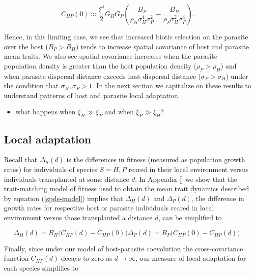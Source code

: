 \documentclass{article}
\begin{document}
\begin{equation}
  C_{HP}(0)\approx \frac{\xi^4}{2}G_HG_P\left(\frac{B_P}{\rho_H\sigma_H^4\sigma_P^2}-\frac{B_H}{\rho_P\sigma_H^2\sigma_P^4}\right).
\end{equation}

Hence, in this limiting case, we see that increased biotic selection on
the parasite over the host (\(B_P>B_H\)) tends to increase spatial
covariance of host and parasite mean traits. We also see spatial
covariance increases when the parasite population density is greater
than the host population density (\(\rho_P>\rho_H\)) and when parasite
dispersal distance exceeds host dispersal distance
(\(\sigma_P>\sigma_H\)) under the condition that
\(\sigma_H,\sigma_P>1\). In the next section we capitalize on these
results to understand patterns of host and parasite local adaptation.

\begin{itemize}
\tightlist
\item
  what happens when \(\xi_H\gg\xi_P\) and when \(\xi_P\gg\xi_H\)?
\end{itemize}

\hypertarget{local-adaptation}{%
\subsection{Local adaptation}\label{local-adaptation}}

Recall that \(\Delta_S(d)\) is the differences in fitness (measured as
population growth rates) for individuals of species \(S=H,P\) reared in
their local environment versus individuals transplanted at some distance
\(d\). In Appendix \ref{} we show that the trait-matching model of
fitness used to obtain the mean trait dynamics described by equation
(\ref{spde-model}) implies that \(\Delta_H(d)\) and \(\Delta_P(d)\), the
difference in growth rates for respective host or parasite individuals
reared in local environment versus those transplanted a distance \(d\),
can be simplified to

\begin{subequations}
  \begin{equation}
    \Delta_H(d)=B_H\big(C_{HP}(d)-C_{HP}(0)\big)
  \end{equation}
  \begin{equation}
    \Delta_P(d)=B_P\big(C_{HP}(0)-C_{HP}(d)\big).
  \end{equation}
\end{subequations}

Finally, since under our model of host-parasite coevolution the
cross-covariance function \(C_{HP}(d)\) decays to zero as
\(d\to\infty\), our measure of local adaptation for each species
simplifies to
\end{document}
